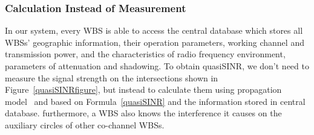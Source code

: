 


\subsubsection*{Calculation Instead of Measurement}
In our system, every WBS is able to access the central database which stores all WBSs' geographic information, their operation parameters, \ie working channel and transmission power, and the characteristics of radio frequency environment, \ie parameters of attenuation and shadowing.
To obtain quasiSINR, we don't need to measure the signal strength on the intersections shown in Figure~\ref{quasiSINRfigure}, but instead to calculate them using propagation model~\cite{Jaentti11} and based on Formula~\ref{quasiSINR} and the information stored in central database.
furthermore, a WBS also knows the interference it causes on the auxiliary circles of other co-channel WBSs.



